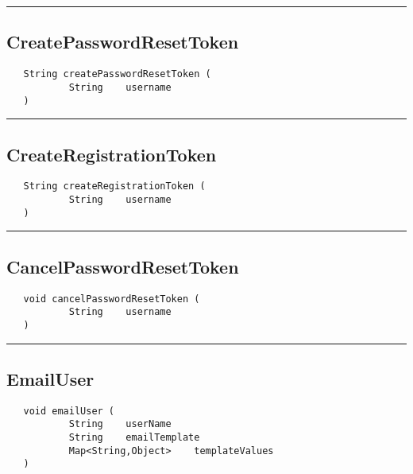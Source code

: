 \rule{15cm}{2pt}
\subsection{CreatePasswordResetToken}
\label{Api:CreatePasswordResetToken}
\begin{verbatim}
   String createPasswordResetToken (
           String    username
   )
\end{verbatim}



\rule{15cm}{2pt}
\subsection{CreateRegistrationToken}
\label{Api:CreateRegistrationToken}
\begin{verbatim}
   String createRegistrationToken (
           String    username
   )
\end{verbatim}



\rule{15cm}{2pt}
\subsection{CancelPasswordResetToken}
\label{Api:CancelPasswordResetToken}
\begin{verbatim}
   void cancelPasswordResetToken (
           String    username
   )
\end{verbatim}



\rule{15cm}{2pt}
\subsection{EmailUser}
\label{Api:EmailUser}
\begin{verbatim}
   void emailUser (
           String    userName
           String    emailTemplate
           Map<String,Object>    templateValues
   )
\end{verbatim}




